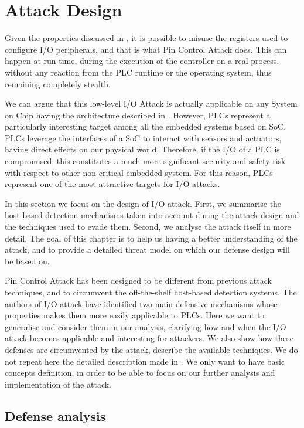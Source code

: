 \section{Attack Design}

Given the properties discussed in , it is possible to misuse the registers used to configure I/O peripherals,
and that is what Pin Control Attack does. This can happen at run-time, during the execution of the controller on a real process,
without any reaction from the PLC runtime or the operating system, thus remaining completely stealth.

We can argue that this low-level I/O Attack is actually applicable on any System on Chip having the
architecture described in . However, PLCs represent a particularly interesting target among all the embedded systems based on SoC.
PLCs leverage the interfaces of a SoC to interact with sensors and actuators, having direct effects on our physical world.
Therefore, if the I/O of a PLC is compromised, this constitutes a much more significant security and safety risk with respect to other
non-critical embedded system. For this reason, PLCs represent one of the most attractive targets for I/O attacks.

In this section we focus on the design of I/O attack. First, we summarise the host-based detection mechanisms taken into account
during the attack design and the techniques used to evade them. Second, we analyse the attack itself in more detail.
The goal of this chapter is to help us having a better understanding of the attack, and to provide a detailed threat model on which our defense design will be based on.

Pin Control Attack has been designed to be different from previous attack techniques, and to circumvent the off-the-shelf host-based detection systems.
The authors of I/O attack have identified two main defensive mechanisms whose properties makes them more easily applicable to PLCs.
Here we want to generalise and consider them in our analysis, clarifying how and when the I/O attack becomes applicable and interesting for attackers.
We also show how these defenses are circumvented by the attack, describe the available techniques.
We do not repeat here the detailed description made in \cite{ghostplc}. We only want to have basic concepts definition,
in order to be able to focus on our further analysis and implementation of the attack.


\subsection{Defense analysis}
\label{sec:def-analysis}

